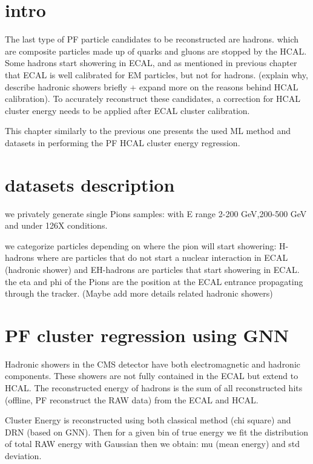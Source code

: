 \section{intro}

The last type of PF particle candidates to be reconstructed are hadrons. which are composite particles made up of quarks and gluons are stopped by the HCAL.
Some hadrons start showering in ECAL, and as mentioned in previous chapter that ECAL is well calibrated for EM particles, but not for hadrons.  (explain why, describe hadronic showers briefly + expand more on the reasons behind HCAL calibration). To accurately reconstruct these candidates, a correction for HCAL cluster energy needs to be applied after ECAL cluster calibration. 

This chapter similarly to the previous one presents the used ML method and datasets in performing the PF HCAL cluster energy regression.

\section{datasets description}

we privately generate single Pions samples: with E range 2-200 GeV,200-500 GeV and under 126X conditions.

we categorize particles depending on where the pion will start showering: H-hadrons where are particles that do not start a nuclear interaction in ECAL (hadronic shower) and EH-hadrons are particles that start showering in ECAL. the eta and phi of the Pions are the position at the ECAL entrance propagating through the tracker. (Maybe add more details related hadronic showers)

\section{PF cluster regression  using GNN}

Hadronic showers in the CMS detector have both electromagnetic and hadronic components. These showers are not fully contained in the ECAL but extend to HCAL. The reconstructed energy of hadrons is the sum of all reconstructed hits (offline, PF reconstruct the RAW data) from the ECAL and HCAL. 

Cluster Energy is reconstructed using both classical method (chi square) and DRN (based on GNN). 
Then for a given bin of true energy we fit the distribution of total RAW energy with Gaussian then we obtain: mu (mean energy) and std deviation.

